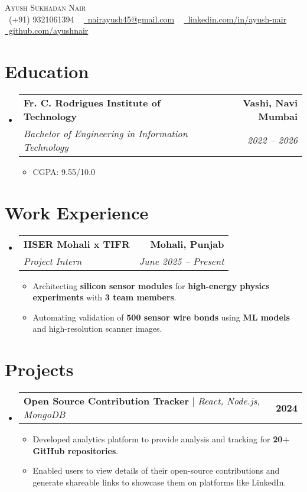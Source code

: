 \documentclass[letterpaper,10pt]{article}
\makeatletter
\newcommand{\resumeItem}[1]{
  \item\small{
    {#1 \vspace{-2pt}}
  }
}
\newcommand{\resumeSubheading}[4]{
  \vspace{-2pt}\item
    \begin{tabular*}{1.0\textwidth}[t]{l@{\extracolsep{\fill}}r}
      \textbf{#1} & \textbf{\small #2} \\
      \textit{\small#3} & \textit{\small #4} \\
    \end{tabular*}\vspace{-6pt}
}
\newcommand{\resumeProjectHeading}[2]{
    \item
    \begin{tabular*}{1.001\textwidth}{l@{\extracolsep{\fill}}r}
      \small#1 & \textbf{\small #2}\\
    \end{tabular*}\vspace{-6pt}
}
\newcommand{\resumeSubHeadingListStart}{\begin{itemize}[leftmargin=0.0in, label={}, topsep=2pt, itemsep=2pt]}
\newcommand{\resumeSubHeadingListEnd}{\end{itemize}\vspace{-2pt}}
\newcommand{\resumeItemListStart}{\begin{itemize}[leftmargin=0.15in, topsep=2pt, itemsep=2pt]}
\newcommand{\resumeItemListEnd}{\end{itemize}\vspace{-2pt}}
\makeatother
\begin{document}
\begin{center}
    {\Huge \scshape Ayush Sukhadan Nair} \\ \vspace{1pt}
    \small \raisebox{-0.1\height}\faPhone\ (+91) 9321061394 ~ 
    \href{mailto:nairayush45@gmail.com}{\raisebox{-0.2\height}\faEnvelope\  nairayush45@gmail.com} ~ 
    \href{https://www.linkedin.com/in/ayush-nair-b71699284/}{\raisebox{-0.2\height}\faLinkedin\ linkedin.com/in/ayush-nair}  ~
    \href{https://github.com/AyushSNair}{\raisebox{-0.2\height}\faGithub\ github.com/ayushnair}
    \vspace{-10pt}
\end{center}

\section{Education}
\resumeSubHeadingListStart
  \resumeSubheading
    {Fr. C. Rodrigues Institute of Technology}{Vashi, Navi Mumbai}
    {Bachelor of Engineering in Information Technology}{2022 -- 2026}
    \resumeItemListStart
      \resumeItem{CGPA: 9.55/10.0}
    \resumeItemListEnd
\resumeSubHeadingListEnd

\section{Work Experience}
\resumeSubHeadingListStart
  \resumeSubheading
    {IISER Mohali x TIFR}{Mohali, Punjab}
    {Project Intern}{June 2025 -- Present}
    \resumeItemListStart
      \resumeItem{Architecting \textbf{silicon sensor modules} for \textbf{high-energy physics experiments} with \textbf{3 team members}.}
      \resumeItem{Automating validation of \textbf{500 sensor wire bonds} using \textbf{ML models} and high-resolution scanner images.}
    \resumeItemListEnd
\resumeSubHeadingListEnd

\section{Projects}
\resumeSubHeadingListStart
  \resumeProjectHeading
      {\textbf{Open Source Contribution Tracker} $|$ \emph{React, Node.js, MongoDB}}{2024}
      \resumeItemListStart
        \resumeItem{Developed analytics platform to provide analysis and tracking for \textbf{20+ GitHub repositories}.}
        \resumeItem{Enabled users to view details of their open-source contributions and generate shareable links to showcase them on platforms like LinkedIn.}
      \resumeItemListEnd
\resumeSubHeadingListEnd
\end{document}
